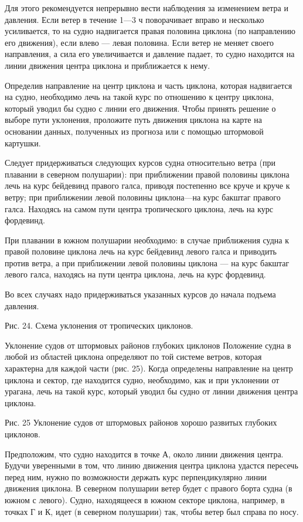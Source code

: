 Для этого рекомендуется непрерывно вести наблюдения за изменением ветра и давления. Если ветер в течение 1—3 ч поворачивает вправо и несколько усиливается, то на судно надвигается правая половина циклона (по направлению его движения), если влево — левая половина. Если ветер не меняет своего направления, а сила его увеличивается и давление падает, то судно находится на линии движения центра циклона и приближается к нему.

Определив направление на центр циклона и часть циклона, которая надвигается на судно, необходимо лечь на такой курс по отношению к центру циклона, который уводил бы судно с линии его движения. Чтобы принять решение о выборе пути уклонения, проложите путь движения циклона на карте на основании данных, полученных из прогноза или с помощью штормовой картушки.

Следует придерживаться следующих курсов судна относительно ветра (при плавании в северном полушарии): при приближении правой половины циклона лечь на курс бейдевинд правого галса, приводя постепенно все круче и круче к ветру; при приближении левой половины циклона—на курс бакштаг правого галса. Находясь на самом пути центра тропического циклона, лечь на курс фордевинд.

При плавании в южном полушарии необходимо: в случае приближения судна к правой половине циклона лечь на курс бейдевинд левого галса и приводить против ветра, а при приближении левой половины циклона — на курс бакштаг левого галса, находясь на пути центра циклона, лечь на курс фордевинд.

Во всех случаях надо придерживаться указанных курсов до начала подъема давления.


Рис. 24. Схема уклонения от тропических циклонов.

Уклонение судов от штормовых районов глубоких циклонов
Положение судна в любой из областей циклона определяют по той системе ветров, которая характерна для каждой части (рис. 25). Когда определены направление на центр циклона и сектор, где находится судно, необходимо, как и при уклонении от урагана, лечь на такой курс, который уводил бы судно от линии движения центра циклона.


Рис. 25 Уклонение судов от штормовых районов хорошо развитых глубоких циклонов.

Предположим, что судно находится в точке А, около линии движения центра. Будучи уверенными в том, что линию движения центра циклона удастся пересечь перед ним, нужно по возможности держать курс перпендикулярно линии движения циклона. В северном полушарии ветер будет с правого борта судна (в южном с левого). Судно, находящееся в южном секторе циклона, например, в точках Г и К, идет (в северном полушарии) так, чтобы ветер был справа по носу.

